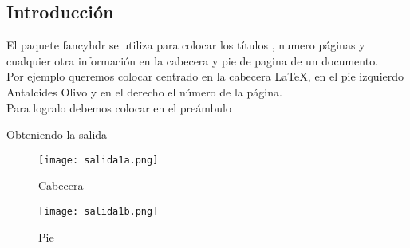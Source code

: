 \subsection{Introducción}
El paquete fancyhdr se utiliza para colocar los títulos , numero páginas y cualquier otra información en la cabecera y pie de pagina de un documento.\\
Por ejemplo queremos colocar centrado en la cabecera \LaTeX , en el pie izquierdo Antalcides Olivo y en el derecho el número de la página.\\
Para logralo debemos colocar en el preámbulo
Obteniendo la salida \\
\begin{figure}[H]
\texttt{[image: salida1a.png]} 
\caption{Cabecera}
\end{figure}
\begin{figure}[H]
\texttt{[image: salida1b.png]} 
\caption{Pie}
\end{figure}

